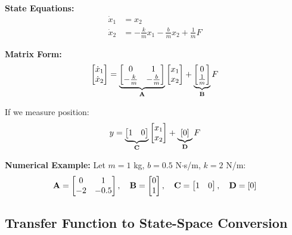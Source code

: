 \textbf{State Equations:}
\begin{align}
    \dot{x}_1 &= x_2 \\
    \dot{x}_2 &= -\frac{k}{m}x_1 - \frac{b}{m}x_2 + \frac{1}{m}F
\end{align}

\textbf{Matrix Form:}
\begin{equation}
    \begin{bmatrix} \dot{x}_1 \\ \dot{x}_2 \end{bmatrix} =
    \underbrace{\begin{bmatrix} 0 & 1 \\ -\frac{k}{m} & -\frac{b}{m} \end{bmatrix}}_{\mathbf{A}}
    \begin{bmatrix} x_1 \\ x_2 \end{bmatrix} +
    \underbrace{\begin{bmatrix} 0 \\ \frac{1}{m} \end{bmatrix}}_{\mathbf{B}} F
    \label{eq:msd_state_space}
\end{equation}

If we measure position:
\begin{equation}
    y = \underbrace{\begin{bmatrix} 1 & 0 \end{bmatrix}}_{\mathbf{C}} \begin{bmatrix} x_1 \\ x_2 \end{bmatrix} + \underbrace{[0]}_{\mathbf{D}} F
\end{equation}

\textbf{Numerical Example:} Let $m = 1$ kg, $b = 0.5$ N$\cdot$s/m, $k = 2$ N/m:
\begin{equation}
    \mathbf{A} = \begin{bmatrix} 0 & 1 \\ -2 & -0.5 \end{bmatrix}, \quad
    \mathbf{B} = \begin{bmatrix} 0 \\ 1 \end{bmatrix}, \quad
    \mathbf{C} = \begin{bmatrix} 1 & 0 \end{bmatrix}, \quad
    \mathbf{D} = [0]
\end{equation}

\subsection{Transfer Function to State-Space Conversion}

